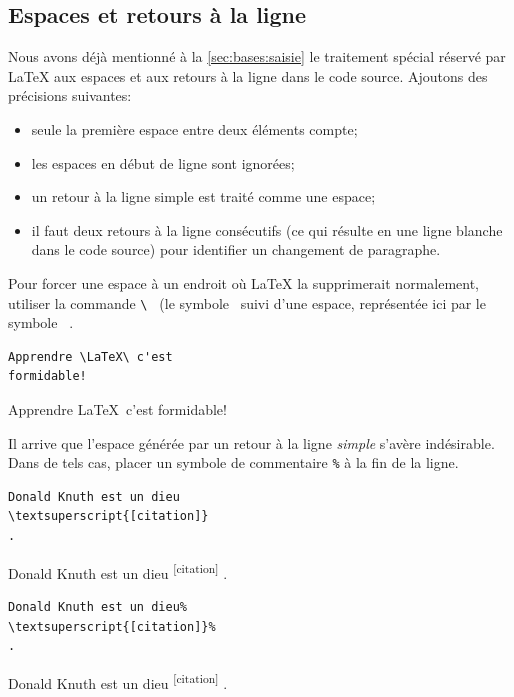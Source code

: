 \subsection{Espaces et retours à la ligne}
\label{sec:bases:caracteres:espaces}

Nous avons déjà mentionné à la \autoref{sec:bases:saisie} le
traitement spécial réservé par {\LaTeX} aux espaces et aux retours à
la ligne dans le code source. Ajoutons des précisions suivantes:
\begin{itemize}
\item seule la première espace entre deux éléments compte;
\item les espaces en début de ligne sont ignorées;
\item un retour à la ligne simple est traité comme une espace;
\item il faut deux retours à la ligne consécutifs (ce qui résulte en
  une ligne blanche dans le code source) pour identifier un changement
  de paragraphe.
\end{itemize}

Pour forcer une espace à un endroit où {\LaTeX} la supprimerait
normalement, utiliser la commande \verb*=\ = (le symbole \bs\ suivi
d'une espace, représentée ici par le symbole \verb*| |.
\begin{demo}
  \begin{texample}
\begin{lstlisting}
Apprendre \LaTeX\ c'est
formidable!
\end{lstlisting}
    \producing
    Apprendre \LaTeX\ c'est
    formidable!
  \end{texample}
\end{demo}

Il arrive que l'espace générée par un retour à la ligne \emph{simple}
s'avère indésirable. Dans de tels cas, placer un symbole de
commentaire \verb=%= à la fin de la ligne.
\begin{demo}
  \begin{texample}
\begin{lstlisting}
Donald Knuth est un dieu
\textsuperscript{[citation]}
.
\end{lstlisting}
    \producing
    Donald Knuth est un dieu
    \textsuperscript{[citation]}
    .
  \end{texample}
  \begin{texample}
\begin{lstlisting}
Donald Knuth est un dieu%
\textsuperscript{[citation]}%
.
\end{lstlisting}
    \producing
    Donald Knuth est un dieu%
    \textsuperscript{[citation]}%
    .
  \end{texample}
\end{demo}

